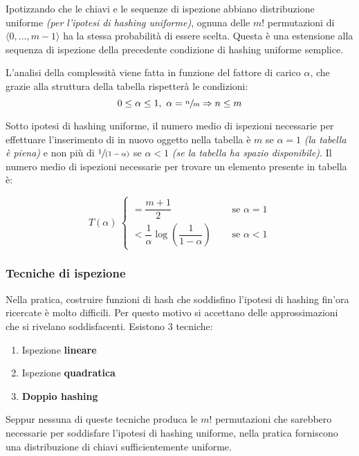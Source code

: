 \documentclass[italian, 10pt]{article}
\begin{document}
Ipotizzando che le chiavi e le sequenze di ispezione abbiano distribuzione uniforme \textit{(per l'ipotesi di hashing uniforme)}, ognuna delle \(m!\) permutazioni di \(\langle 0, \ldots, m-1 \rangle\) ha la stessa probabilità di essere scelta.
Questa è una estensione alla sequenza di ispezione della precedente condizione di hashing uniforme semplice.

L'analisi della complessità viene fatta in funzione del fattore di carico \(\alpha\), che grazie alla struttura della tabella rispetterà le condizioni:
\[ 0 \leq \alpha \leq 1,\ \alpha = \sfrac{n}{m} \Rightarrow n \leq m \]

Sotto ipotesi di hashing uniforme, il numero medio di ispezioni necessarie per effettuare l'inserimento di in nuovo oggetto nella tabella è \(m\) se \(\alpha = 1\) \textit{(la tabella è piena)} e non più di \(\sfrac{1}{(1-\alpha)}\) se \(\alpha<1\) \textit{(se la tabella ha spazio disponibile)}.
Il numero medio di ispezioni necessarie per trovare un elemento presente in tabella è:

\[  T(\alpha) \ \begin{cases}
    = \dfrac{m+1}{2}                                         & \quad \text{ se } \alpha = 1 \\[5pt]
    < \dfrac{1}{\alpha} \log\left(\dfrac{1}{1-\alpha}\right) & \quad \text{ se } \alpha < 1
  \end{cases}  \]

\subsubsection{Tecniche di ispezione}

Nella pratica, costruire funzioni di hash che soddisfino l'ipotesi di hashing fin'ora ricercate è molto difficili.
Per questo motivo si accettano delle approssimazioni che si rivelano soddisfacenti.
Esistono \(3\) tecniche:

\begin{enumerate}
  \item Ispezione \textbf{lineare}
  \item Ispezione \textbf{quadratica}
  \item \textbf{Doppio hashing}
\end{enumerate}

Seppur nessuna di queste tecniche produca le \(m!\) permutazioni che sarebbero necessarie per soddisfare l'ipotesi di hashing uniforme, nella pratica forniscono una distribuzione di chiavi sufficientemente uniforme.
\end{document}
